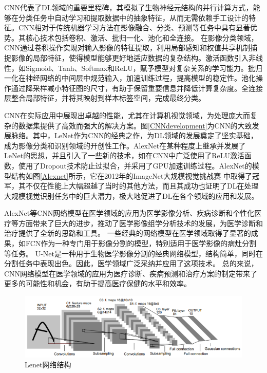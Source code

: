 CNN代表了DL领域的重要里程碑，其模拟了生物神经元结构的并行计算方式，能够在分类任务中自动学习和提取数据中的抽象特征，从而无需依赖手工设计的特征。CNN相对于传统机器学习方法在影像融合、分类、预测等任务中具有显著优势。其核心技术包括卷积、激活、批归一化、池化和全连接。
在影像分类领域，CNN通过卷积操作实现对输入影像的特征提取，利用局部感知和权值共享机制捕捉影像的局部特征，使得模型能够更好地适应数据的复杂结构。激活函数引入非线性，如Sigmoid、Tanh、Softmax和ReLU，赋予模型对复杂关系的学习能力。批归一化在神经网络的中间层中规范输入，加速训练过程，提高模型的稳定性。池化操作通过降采样减小特征图的尺寸，有助于保留重要信息并降低计算复杂度。全连接层整合局部特征，并将其映射到样本标签空间，完成最终分类。

    
CNN在实际应用中展现出卓越的性能，尤其在计算机视觉领域，为处理庞大而复杂的数据集提供了高效而强大的解决方案。图\ref{CNNdevelopment}为CNN的大致发展脉络。其中，LeNet\cite{lecun1998gradient}作为CNN的经典之作，为DL领域的发展奠定了坚实基础，成为影像分类和识别领域的开创性工作。AlexNet\cite{krizhevsky2012imagenet}在某种程度上继承并发展了LeNet的思想，并且引入了一些新的技术，如在CNN中广泛使用了ReLU激活函数，使用了Dropout技术防止过拟合，并采用了GPU加速训练过程。AlexNet的模型结构如图\ref{Alexnet}所示，它在2012年的ImageNet大规模视觉挑战赛
中取得了冠军，其不仅在性能上大幅超越了当时的其他方法，而且其成功也证明了DL在处理大规模视觉识别任务中的巨大潜力，极大地促进了DL在各个领域的应用和发展。 

AlexNet等CNN网络模型在医学领域的应用为医学影像分析、疾病诊断和个性化医疗等方面带来了巨大的进步，推动了医学影像组学分析技术的发展，为医学诊断和治疗提供了全新的思路和工具。
一些经典的网络模型在医学领域取得了显著的成果，如FCN\cite{long2015fully}作为一种专门用于影像分割的模型，特别适用于医学影像的病灶分割等任务。
U-Net\cite{ronneberger2015u}是一种用于生物医学影像分割的经典网络模型，结构简单，同时在分割任务中表现出色。因此，医学领域广泛采纳并应用了这项技术。
总的来说，CNN网络模型在医学领域的应用为医疗诊断、疾病预测和治疗方案的制定带来了更多的可能性和机会，有助于提高医疗保健的水平和效率。

   \begin{figure}[htbp]
      \centering  
      \includegraphics[width=0.9\linewidth]{figs/Lenet.png}
      \caption{Lenet网络结构}\label{Lenet}
    \end{figure}
  \fi


